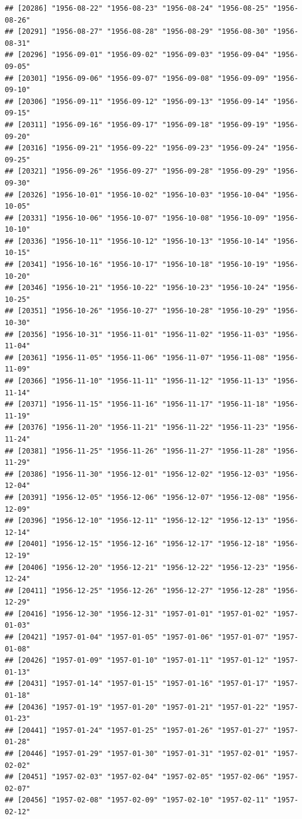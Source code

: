 \documentclass{article}\usepackage[]{graphicx}\usepackage[]{color}
\makeatletter
\newenvironment{kframe}{%
 \def\at@end@of@kframe{}%
 \ifinner\ifhmode%
  \def\at@end@of@kframe{\end{minipage}}%
  \begin{minipage}{\columnwidth}%
 \fi\fi%
 \def\FrameCommand##1{\hskip\@totalleftmargin \hskip-\fboxsep
 \colorbox{shadecolor}{##1}\hskip-\fboxsep
     \hskip-\linewidth \hskip-\@totalleftmargin \hskip\columnwidth}%
 \MakeFramed {\advance\hsize-\width
   \@totalleftmargin\z@ \linewidth\hsize
   \@setminipage}}%
 {\par\unskip\endMakeFramed%
 \at@end@of@kframe}
\newenvironment{knitrout}{}{} %
\makeatother
\begin{document}
\begin{description}
\begin{knitrout}
\begin{kframe}
\begin{verbatim}
## [20286] "1956-08-22" "1956-08-23" "1956-08-24" "1956-08-25" "1956-08-26"
## [20291] "1956-08-27" "1956-08-28" "1956-08-29" "1956-08-30" "1956-08-31"
## [20296] "1956-09-01" "1956-09-02" "1956-09-03" "1956-09-04" "1956-09-05"
## [20301] "1956-09-06" "1956-09-07" "1956-09-08" "1956-09-09" "1956-09-10"
## [20306] "1956-09-11" "1956-09-12" "1956-09-13" "1956-09-14" "1956-09-15"
## [20311] "1956-09-16" "1956-09-17" "1956-09-18" "1956-09-19" "1956-09-20"
## [20316] "1956-09-21" "1956-09-22" "1956-09-23" "1956-09-24" "1956-09-25"
## [20321] "1956-09-26" "1956-09-27" "1956-09-28" "1956-09-29" "1956-09-30"
## [20326] "1956-10-01" "1956-10-02" "1956-10-03" "1956-10-04" "1956-10-05"
## [20331] "1956-10-06" "1956-10-07" "1956-10-08" "1956-10-09" "1956-10-10"
## [20336] "1956-10-11" "1956-10-12" "1956-10-13" "1956-10-14" "1956-10-15"
## [20341] "1956-10-16" "1956-10-17" "1956-10-18" "1956-10-19" "1956-10-20"
## [20346] "1956-10-21" "1956-10-22" "1956-10-23" "1956-10-24" "1956-10-25"
## [20351] "1956-10-26" "1956-10-27" "1956-10-28" "1956-10-29" "1956-10-30"
## [20356] "1956-10-31" "1956-11-01" "1956-11-02" "1956-11-03" "1956-11-04"
## [20361] "1956-11-05" "1956-11-06" "1956-11-07" "1956-11-08" "1956-11-09"
## [20366] "1956-11-10" "1956-11-11" "1956-11-12" "1956-11-13" "1956-11-14"
## [20371] "1956-11-15" "1956-11-16" "1956-11-17" "1956-11-18" "1956-11-19"
## [20376] "1956-11-20" "1956-11-21" "1956-11-22" "1956-11-23" "1956-11-24"
## [20381] "1956-11-25" "1956-11-26" "1956-11-27" "1956-11-28" "1956-11-29"
## [20386] "1956-11-30" "1956-12-01" "1956-12-02" "1956-12-03" "1956-12-04"
## [20391] "1956-12-05" "1956-12-06" "1956-12-07" "1956-12-08" "1956-12-09"
## [20396] "1956-12-10" "1956-12-11" "1956-12-12" "1956-12-13" "1956-12-14"
## [20401] "1956-12-15" "1956-12-16" "1956-12-17" "1956-12-18" "1956-12-19"
## [20406] "1956-12-20" "1956-12-21" "1956-12-22" "1956-12-23" "1956-12-24"
## [20411] "1956-12-25" "1956-12-26" "1956-12-27" "1956-12-28" "1956-12-29"
## [20416] "1956-12-30" "1956-12-31" "1957-01-01" "1957-01-02" "1957-01-03"
## [20421] "1957-01-04" "1957-01-05" "1957-01-06" "1957-01-07" "1957-01-08"
## [20426] "1957-01-09" "1957-01-10" "1957-01-11" "1957-01-12" "1957-01-13"
## [20431] "1957-01-14" "1957-01-15" "1957-01-16" "1957-01-17" "1957-01-18"
## [20436] "1957-01-19" "1957-01-20" "1957-01-21" "1957-01-22" "1957-01-23"
## [20441] "1957-01-24" "1957-01-25" "1957-01-26" "1957-01-27" "1957-01-28"
## [20446] "1957-01-29" "1957-01-30" "1957-01-31" "1957-02-01" "1957-02-02"
## [20451] "1957-02-03" "1957-02-04" "1957-02-05" "1957-02-06" "1957-02-07"
## [20456] "1957-02-08" "1957-02-09" "1957-02-10" "1957-02-11" "1957-02-12"

\end{verbatim}
\end{kframe}
\end{knitrout}
\end{description}
\end{document}
